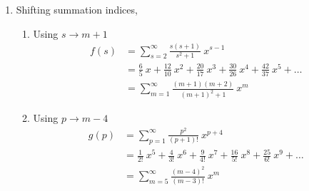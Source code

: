 \begin{enumerate}
    \item Shifting summation indices,
          \begin{enumerate}
              \item Using $ s \rightarrow m+1 $
                    \begin{align}
                        f(s) & = \sum_{s = 2}^{\infty}\frac{s(s+1)}
                        {s^2 + 1}\ x^{s-1}                               \\
                             & = \frac{6}{5}\ x + \frac{12}{10}\ x^2
                        + \frac{20}{17}\ x^3 + \frac{30}{26}\ x^4
                        + \frac{42}{37}\ x^5 + \dots                     \\
                             & = \sum_{m = 1}^{\infty} \frac{(m+1)(m+2)}
                        {(m+1)^2 + 1}\ x^m
                    \end{align}
              \item Using $ p \rightarrow m-4$
                    \begin{align}
                        g(p) & = \sum_{p = 1}^{\infty}\frac{p^2}
                        {(p+1)!}\ x^{p+4}                              \\
                             & = \frac{1}{2!}\ x^5 + \frac{4}{3!}\ x^6
                        + \frac{9}{4!}\ x^7 + \frac{16}{5!}\ x^8
                        + \frac{25}{6!}\ x^9 + \dots                   \\
                             & = \sum_{m = 5}^{\infty} \frac{(m-4)^2}
                        {(m-3)!}\ x^m
                    \end{align}
          \end{enumerate}


\end{enumerate}
